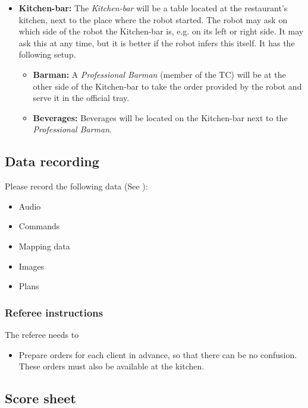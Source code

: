 \begin{itemize}
	\item \textbf{Kitchen-bar:} The \textit{Kitchen-bar} will be a table located at the restaurant's kitchen, next to the place where the robot started. 
	The robot may ask on which side of the robot the Kitchen-bar is, e.g. on its left or right side. It may ask this at any time, but it is better if the robot infers this itself. 
	It has the following setup.
	\begin{itemize}
		\item \textbf{Barman:} A \textit{Professional Barman} (member of the TC) will be at the other side of the Kitchen-bar to take the order provided by the robot and serve it in the official tray.
		\item \textbf{Beverages:} Beverages will be located on the Kitchen-bar next to the \textit{Professional Barman}.
	\end{itemize}

\end{itemize}

\subsection{Data recording}
  Please record the following data (See ):
  \begin{itemize}
   \item Audio
   \item Commands
   \item Mapping data
   \item Images
   \item Plans
  \end{itemize}

\subsubsection{Referee instructions}

The referee needs to
\begin{itemize}
  \item Prepare orders for each client in advance, so that there can be no confusion. These orders must also be available at the kitchen. 
\end{itemize}



\newpage
\subsection{Score sheet}


